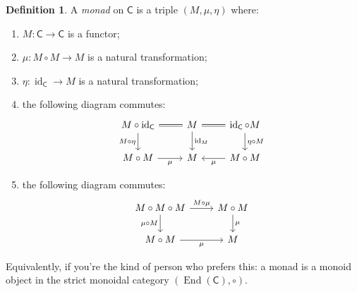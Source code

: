 \documentclass{article}
\theoremstyle{definition}
\newtheorem{defn}{Definition}
\newcommand{\C}{\mathsf{C}}
\DeclareMathOperator{\id}{id}
\begin{document}
\begin{defn}\label{def:monad}
A \emph{monad} on $\C$ is a triple $(M, \mu, \eta)$ where:
\begin{enumerate}[label = (\roman*.)]
    \item\label{def:monad:data:functor} $M : \C \to \C$ is a functor;
    \item\label{def:monad:data:multiplication} $\mu : M \circ M \to M$ is a natural transformation;
    \item\label{def:monad:data:unit} $\eta : \id_\C \to M$ is a natural transformation;
    \item\label{def:monad:condition:id} the following diagram commutes:
    \[\begin{tikzcd}[ampersand replacement=\&]
    	{M \circ \id_\C} \& M \& {\id_\C \circ M} \\
    	{M \circ M} \& M \& {M \circ M}
    	\arrow[equals, from=1-1, to=1-2]
    	\arrow[equals, from=1-2, to=1-3]
    	\arrow["{M \circ \eta}"', from=1-1, to=2-1]
    	\arrow["{\eta \circ M}", from=1-3, to=2-3]
    	\arrow["\mu"', from=2-1, to=2-2]
    	\arrow["\mu", from=2-3, to=2-2]
    	\arrow["{\id_M}", from=1-2, to=2-2]
    \end{tikzcd}\]
    \item\label{def:monad:condition:assoc} the following diagram commutes:
    \[\begin{tikzcd}[ampersand replacement=\&]
    	{M \circ M \circ M} \& {M \circ M} \\
    	{M \circ M} \& M
    	\arrow["{M \circ \mu}", from=1-1, to=1-2]
    	\arrow["{\mu \circ M}"', from=1-1, to=2-1]
    	\arrow["\mu"', from=2-1, to=2-2]
    	\arrow["\mu", from=1-2, to=2-2]
    \end{tikzcd}\]
\end{enumerate}
Equivalently, if you're the kind of person who prefers this: a monad is a monoid object in the strict monoidal category $(\operatorname{End}(\C), \circ)$.
\end{defn}
\end{document}
